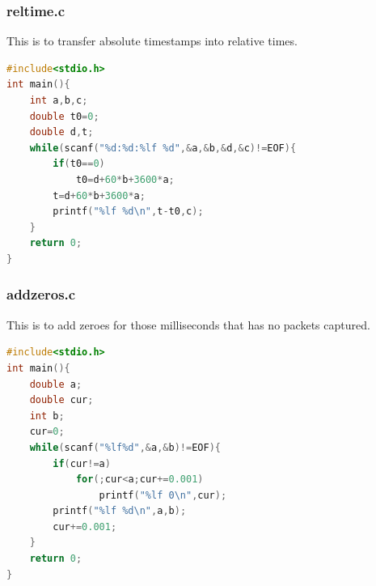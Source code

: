 \documentclass[12pt,a4paper]{article}
\begin{document}
\subsubsection*{reltime.c}
This is to transfer absolute timestamps into relative times.
\begin{lstlisting}[language=C]
#include<stdio.h>
int main(){
	int a,b,c;
	double t0=0;
	double d,t;
	while(scanf("%d:%d:%lf %d",&a,&b,&d,&c)!=EOF){
		if(t0==0)
			t0=d+60*b+3600*a;
		t=d+60*b+3600*a;
		printf("%lf %d\n",t-t0,c);
	}
	return 0;
}
\end{lstlisting}

\subsubsection*{addzeros.c}
This is to add zeroes for those milliseconds that has no packets captured.
\begin{lstlisting}[language=C]
#include<stdio.h>
int main(){
	double a;
	double cur;
	int b;
	cur=0;
	while(scanf("%lf%d",&a,&b)!=EOF){
		if(cur!=a)
			for(;cur<a;cur+=0.001)
				printf("%lf 0\n",cur);
		printf("%lf %d\n",a,b);
		cur+=0.001;
	}
	return 0;
}
\end{lstlisting}
\end{document}
